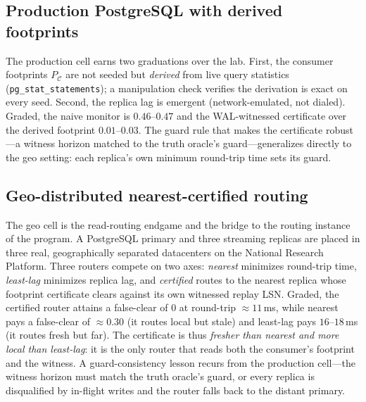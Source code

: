 \documentclass[lettersize,onecolumn]{IEEEtran}
\theoremstyle{remark}
\newcommand{\PC}{P_{\mathcal{C}}}
\begin{document}
\subsection{Production PostgreSQL with derived footprints}
The production cell earns two graduations over the lab. First, the consumer
footprints $\PC$ are not seeded but \emph{derived} from live query statistics
(\texttt{pg\_stat\_statements}); a manipulation check verifies the derivation is
exact on every seed. Second, the replica lag is emergent (network-emulated,
not dialed). Graded, the naive monitor is $0.46$--$0.47$ and the WAL-witnessed
certificate over the derived footprint $0.01$--$0.03$. The guard rule that makes
the certificate robust---a witness horizon matched to the truth oracle's
guard---generalizes directly to the geo setting: each replica's own minimum
round-trip time sets its guard.

\subsection{Geo-distributed nearest-certified routing}\label{sec:geo}
The geo cell is the read-routing endgame and the bridge to the routing instance
of the program. A PostgreSQL primary and three streaming replicas are placed in
three real, geographically separated datacenters on the National Research
Platform. Three routers compete on two axes: \emph{nearest} minimizes
round-trip time, \emph{least-lag} minimizes replica lag, and \emph{certified}
routes to the nearest replica whose footprint certificate clears against its own
witnessed replay LSN. Graded, the certified router attains a false-clear of $0$
at round-trip $\approx11$\,ms, while nearest pays a false-clear of $\approx0.30$
(it routes local but stale) and least-lag pays $16$--$18$\,ms (it routes fresh
but far). The certificate is thus \emph{fresher than nearest and more local than
least-lag}: it is the only router that reads both the consumer's footprint and
the witness. A guard-consistency lesson recurs from the production cell---the
witness horizon must match the truth oracle's guard, or every replica is
disqualified by in-flight writes and the router falls back to the distant
primary.
\end{document}
